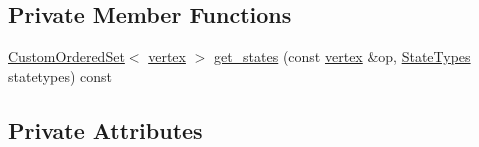 \subsection*{Private Member Functions}
\begin{DoxyCompactItemize}
\item 
\hyperlink{classCustomOrderedSet}{Custom\+Ordered\+Set}$<$ \hyperlink{graph_8hpp_abefdcf0544e601805af44eca032cca14}{vertex} $>$ \hyperlink{classStateTransitionGraphManager_ac6b2201c821c65cbf25d0578eacdbb51}{get\+\_\+states} (const \hyperlink{graph_8hpp_abefdcf0544e601805af44eca032cca14}{vertex} \&op, \hyperlink{classStateTransitionGraphManager_a97cb88662c4d757e2b09cadd3ccad814}{State\+Types} statetypes) const
\end{DoxyCompactItemize}
\subsection*{Private Attributes}
